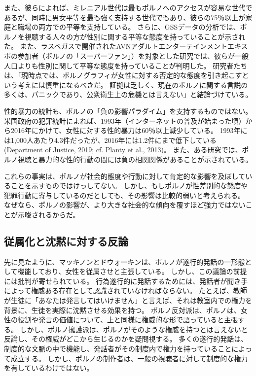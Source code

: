 \documentclass[paper=a4,book,openany]{jlreq} \usepackage{mystyle}
\begin{document}
また、彼らによれば、ミレニアル世代は最もポルノへのアクセスが容易な世代であるが、同時に男女平等を最も強く支持する世代でもあり、彼らの75％以上が家庭と職場の両方での平等を支持している。
さらに、GSSデータの分析では、ポルノを視聴する人々の方が性別に関する平等な態度を持っていることが示された\citep{taylor16:_is_pornog_reall_makin_hate_women}。
また、ラスベガスで開催されたAVNアダルトエンターテインメントエキスポの参加者（ポルノの「スーパーファン」）を対象とした研究では、彼らが一般人口よりも性別に関して平等な態度を持っていることが判明した\citep{jackson19:_expos_mens_gender_role_attit_porn_super}。
研究者たちは、「現時点では、ポルノグラフィが女性に対する否定的な態度を引き起こすという考えには慎重になるべきだ。
証拠は乏しく、現在のポルノに関する言説の多くは、パニックであり、公衆衛生上の危機とは言えない」と結論づけている\citep{maginn19:_how_male_porn_super_reall_view_women}。

性的暴力の統計も、ポルノの「負の影響パラダイム」を支持するものではない。
米国政府の犯罪統計によれば、1993年（インターネットの普及が始まった頃）から2016年にかけて、女性に対する性的暴力は60％以上減少している。
1993年には1,000人あたり4.3件だったが、2016年には1.2件にまで低下している(Department of Justice, 2019; cf. Planty et al., 2013)。
\nocite{department19:_nation_crime_victim_survey}
また、ある研究では、ポルノ視聴と暴力的な性的行動の間には負の相関関係があることが示されている\citep{ferguson09:_pleas_is_momen}。

これらの事実は、ポルノが社会的態度や行動に対して肯定的な影響を及ぼしていることを示すものではけっしてない。
しかし、もしポルノが性差別的な態度や犯罪行動に寄与しているのだとしても、その影響は比較的弱いと考えられる。
なぜなら、ポルノの影響が、より大きな社会的な傾向を覆すほど強力ではないことが示唆されるからだ。

\subsection{従属化と沈黙に対する反論}

先に見たように、マッキノンとドウォーキンは、ポルノが遂行的発話の一形態として機能しており、女性を従属させと主張している。
しかし、この議論の前提には批判が寄せられている。
行為遂行的に発話するためには、発話者が聞き手によって権威ある存在として認識されていなければならない。
たとえば、教師が生徒に「あなたは発言してはいけません」と言えば、それは教室内での権力を背景に、生徒を実際に沈黙させる効果を持つ。
ポルノ反対派は、ポルノは、女性の役割や発言の価値について、上と同様に権威的な形で語っていると主張する。
しかし、ポルノ擁護派は、ポルノがそのような権威を持つとは言えないと反論し、その権威がどこから生じるのかを疑問視する。
多くの遂行的発話は、制度的な文脈の中で機能し、発話者がその制度内で権力を持っていることによって成立する。
しかし、ポルノの制作者は、一般の視聴者に対して制度的な権力を有しているわけではない。
\end{document}
